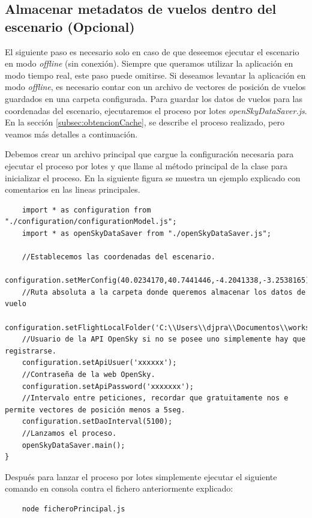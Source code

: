 \documentclass[a4paper, 11pt]{book}
\begin{document}
\subsection{Almacenar metadatos de vuelos dentro del escenario (Opcional)}
El siguiente paso es necesario solo en caso de que deseemos ejecutar el escenario en modo \emph{offline} (sin conexión). Siempre que queramos utilizar la aplicación en modo tiempo real, este paso puede omitirse.
Si deseamos levantar la aplicación en modo \emph{offline}, es necesario contar con un archivo de vectores de posición de vuelos guardados en una carpeta configurada. Para guardar los datos de vuelos para las coordenadas del escenario, ejecutaremos el proceso por lotes \emph{openSkyDataSaver.js}. En la sección \ref{subsec:obtencionCache}, se describe el proceso realizado, pero veamos más detalles a continuación.

Debemos crear un archivo principal que cargue la configuración necesaria para ejecutar el proceso por lotes y que llame al método principal de la clase para inicializar el proceso. En la siguiente figura se muestra un ejemplo explicado con comentarios en las lineas principales.
\begin{verbatim}
	import * as configuration from "./configuration/configurationModel.js";
	import * as openSkyDataSaver from "./openSkyDataSaver.js";
	
	//Establecemos las coordenadas del escenario.
	configuration.setMerConfig(40.0234170,40.7441446,-4.2041338,-3.2538165);
	//Ruta absoluta a la carpeta donde queremos almacenar los datos de vuelo
	configuration.setFlightLocalFolder('C:\\Users\\djpra\\Documentos\\workspaceTFG\\........');
	//Usuario de la API OpenSky si no se posee uno simplemente hay que registrarse.
	configuration.setApiUsuer('xxxxxx');
	//Contraseña de la web OpenSky.
	configuration.setApiPassword('xxxxxxx');
	//Intervalo entre peticiones, recordar que gratuitamente nos e permite vectores de posición menos a 5seg.
	configuration.setDaoInterval(5100);
	//Lanzamos el proceso.
	openSkyDataSaver.main();
}
\end{verbatim}

Después para lanzar el proceso por lotes simplemente ejecutar el siguiente comando en consola contra el fichero anteriormente explicado:
{\scriptsize
\begin{verbatim}
	node ficheroPrincipal.js
\end{verbatim}
}
\end{document}
